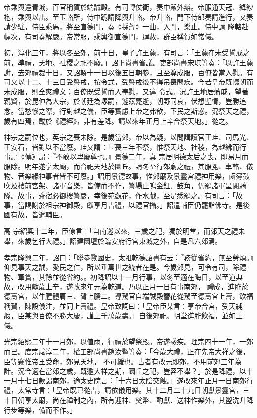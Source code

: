 \begin{pinyinscope}
 帝乘輿還青城，百官稱賀於端誠殿。有司轉仗衛，奏中嚴外辦。帝服通天冠、絳紗袍，乘輿以出。至玉輅所，侍中跪請降輿升輅。帝升輅，門下侍郎奏請進行，又奏請少駐，侍臣乘馬，將至宣德門，奏《採薺》一曲，入門，樂止。侍中請
 降輅赴幄次，有司奏解嚴。帝常服，乘輿御宣德門，肆赦，群臣稱賀如常儀。



 初，淳化三年，將以冬至郊，前十日，皇子許王薨，有司言：「王薨在未受誓戒之前，準禮，天地、社稷之祀不廢。」詔下尚書省議。吏部尚書宋琪等奏：「以許王薨謝，去郊禮裁十日，又詔輟十一日以後五日朝參，且至尊成服，百僚皆當入慰。有司又以十二、十三日受誓戒，按令式，受誓戒後不得吊喪問疾。今若皇帝既輟朝而未成服，則全爽禮文；百僚既受誓而入奉慰，又違
 令式。況許王地居藩戚，望著親賢，於昆仲為大宗，於朝廷為塚嗣，遽茲薨逝，朝野同哀，伏想聖情，豈勝追念。當愁慘之際，行對越之儀，臣等實慮上帝之弗歆，下民之斯惑。況祭天之禮，歲有四焉，載於《禮經》，非有差降。請以來年正月上辛合祭天地。」從之。



 神宗之嗣位也，英宗之喪未除。是歲當郊，帝以為疑，以問講讀官王珪、司馬光、王安石，皆對以不當廢。珪又謂：「『喪三年不祭，惟祭天地、社稷，為越紼而行事。』《傳》謂：『不敢以卑廢尊也。』景德二年，真
 宗居明德太后之喪，即易月而服除。明年遂享太廟，而合祀天地於圜丘。請冬至行郊廟之禮，其服冕、車輅、儀物、音樂緣神事者皆不可廢。」詔用景德故事，惟郊廟及景靈宮禮神用樂，鹵簿鼓吹及樓前宮架、諸軍音樂，皆備而不作，警場止鳴金鉦、鼓角，仍罷諸軍呈閱騎隊。故事，齋宿必御樓警嚴，幸後苑觀花，作水戲，至是悉罷之。有司言：「故事，當謁謝於祖宗神御殿，獻享月吉禮，以禮官攝。」詔遣輔臣仍罷詣佛寺。是後國有故，皆遣輔臣。



 高
 宗紹興十二年，臣僚言：「自南巡以來，三歲之祀，獨於明堂，而郊天之禮未舉，來歲乞行大禮。」詔建圜壇於臨安府行宮東城之外，自是凡六郊焉。



 孝宗隆興二年，詔曰：「聯恭覽國史，太祖乾德詔書有云：『務從省約，無至勞煩。』仰見事天之誠，愛民之仁，所以垂萬世之統者在是。今歲郊見，可令有司，除禮物、軍賞，其餘並從省約。。初降詔以十一月行事，以冬至適在晦日，以至道典故，改用獻歲上辛，遂改來年元為乾道。乃以正月一日有事南郊，
 禮成，進胙於德壽宮，以牛腥體肩三、臂上臑二。導駕官自端誠殿簪花從駕至德壽宮上壽，飲福稱賀，陳設儀注，並同上壽禮。皇帝致詞曰：「皇帝臣某言：享帝合宮，受天純嘏，臣某與百僚不勝大慶，謹上千萬歲壽。」自後郊祀、明堂進胙飲福，並如上儀。



 光宗紹熙二年十一月郊，以值雨，行禮於望祭殿。帝遂感疾。理宗四十一年，一郊而已。度宗咸淳二年，權工部尚書趙汝暨等奏：「今歲大禮，正在先帝大祥之後，臣等竊惟帝王受命，郊見天地，
 不可緩也。古者有改元即郊，不用前郊三年為計。況今適在當郊之歲，既逾大祥之期，圜丘之祀，豈容不舉？」於是降禮，以十一月十七日款謁南郊，適太史院言：「十六日太陰交蝕。」遂改來年正月一日南郊行禮，太常寺言：「皇帝既已從吉，請依儀用樂。其十二月二十九日朝獻景靈宮，三十日朝享太廟，尚在禫制之內，所有迎神、奠幣、酌獻、送神作樂外，其盥洗升降行步等樂，備而不作。」



\end{pinyinscope}